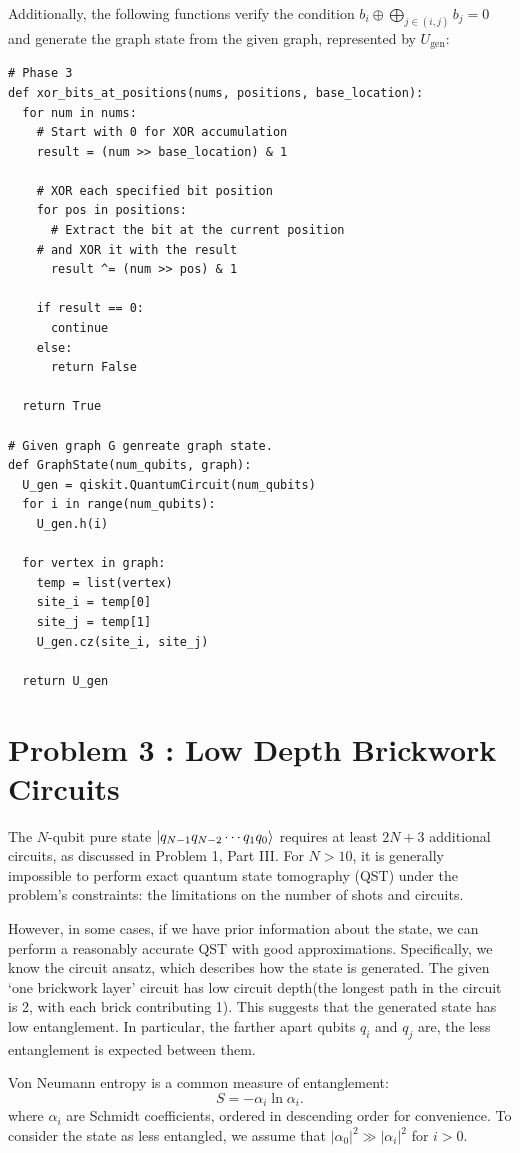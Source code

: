 \documentclass[a4paper, 11pt]{article}
\begin{document}
Additionally, the following functions verify the condition $b_i \oplus \bigoplus_{j \in (i,j)} b_j = 0$ and generate the graph state from the given graph, represented by $U_\text{gen}$:
\begin{verbatim}
# Phase 3
def xor_bits_at_positions(nums, positions, base_location):
  for num in nums:    
    # Start with 0 for XOR accumulation
    result = (num >> base_location) & 1
    
    # XOR each specified bit position
    for pos in positions:
      # Extract the bit at the current position 
    # and XOR it with the result
      result ^= (num >> pos) & 1
    
    if result == 0:
      continue
    else:
      return False

  return True

# Given graph G genreate graph state.
def GraphState(num_qubits, graph):
  U_gen = qiskit.QuantumCircuit(num_qubits)
  for i in range(num_qubits):
    U_gen.h(i)

  for vertex in graph:
    temp = list(vertex)
    site_i = temp[0]
    site_j = temp[1]
    U_gen.cz(site_i, site_j)

  return U_gen
\end{verbatim}

\section*{Problem 3 : Low Depth Brickwork Circuits}

The $N$-qubit pure state $\ket{q_{N-1} q_{N-2} \cdots q_1 q_0}$ requires at least $2N + 3$ additional circuits, as discussed in Problem 1, Part III. 
For $N > 10$, it is generally impossible to perform exact quantum state tomography (QST) under the problem's constraints: the limitations on the number of shots and circuits.

However, in some cases, if we have prior information about the state, we can perform a reasonably accurate QST with good approximations. 
Specifically, we know the circuit ansatz, which describes how the state is generated. 
The given `one brickwork layer' circuit has low circuit depth(the longest path in the circuit is 2, with each brick contributing 1). 
This suggests that the generated state has low entanglement.
In particular, the farther apart qubits $q_i$ and $q_j$ are, the less entanglement is expected between them.

Von Neumann entropy is a common measure of entanglement:
\begin{equation}
  S = - \alpha_{i} \ln \alpha_{i}. 
\end{equation}
where $\alpha_i$ are Schmidt coefficients, ordered in descending order for convenience. 
To consider the state as less entangled, we assume that $|\alpha_0|^2 \gg |\alpha_i|^2$ for $i > 0$.
\end{document}
